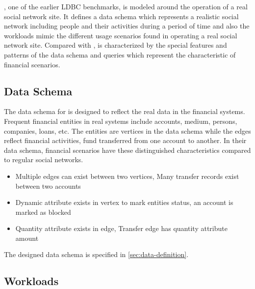 \ldbcsnb, one of the earlier LDBC benchmarks, is modeled around the operation of a real social network site. It defines a data schema which represents a realistic social network including people and their activities during a period of time and also the workloads mimic the different usage scenarios found in operating a real social network site. Compared with \ldbcsnb, \ldbcfinbench is characterized by the special features and patterns of the data schema and queries which represent the characteristic of financial scenarios.

\subsection{Data Schema}

The data schema for \ldbcfinbench is designed to reflect the real data in the financial systems. Frequent
financial entities in real systems include accounts, medium, persons, companies, loans, etc. The
entities are vertices in the data schema while the edges reflect financial activities, \eg fund transferred
from one account to another. In their data schema, financial scenarios have these distinguished characteristics
compared to regular social networks.
\begin{itemize}
      \item Multiple edges can exist between two vertices, \eg Many transfer records exist between two accounts
      \item Dynamic attribute exists in vertex to mark entities status, \eg an account is marked as blocked
      \item Quantity attribute exists in edge, \eg Transfer edge has quantity attribute amount
\end{itemize}

The designed data schema is specified in \autoref{sec:data-definition}.

\subsection{Workloads}

